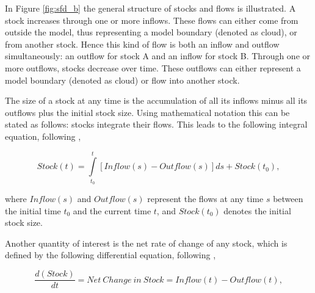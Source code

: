 In Figure \ref{fig:sfd_b} the general structure of stocks and flows is illustrated. A stock increases through one or more inflows. These flows can either come from outside the model, thus representing a model boundary (denoted as cloud), or from another stock. Hence this kind of flow is both an inflow and outflow simultaneously: an outflow for stock A and an inflow for stock B. Through one or more outflows, stocks decrease over time. These outflows can either represent a model boundary (denoted as cloud) or flow into another stock.

The size of a stock at any time is the accumulation of all its inflows minus all its outflows plus the initial stock size. Using mathematical notation this can be stated as follows: stocks integrate their flows. This leads to the following integral equation, following \citet[p. 194]{Sterman2000},

\begin{equation}\label{eq:int}
		Stock(t) = \int\limits_{t_0}^t [Inflow(s) - Outflow(s)]ds + Stock(t_0),
\end{equation}

where $Inflow(s)$ and $Outflow(s)$ represent the flows at any time $s$ between the initial time $t_0$ and the current time $t$, and $Stock(t_0)$ denotes the initial stock size. 

Another quantity of interest is the net rate of change of any stock, which is defined by the following differential equation, following \citet[p. 194]{Sterman2000},

\begin{equation}\label{eq:dif}
		\frac{d(Stock)}{dt} = \mathit{Net~Change~in~Stock} = Inflow(t) - Outflow(t),
\end{equation}


